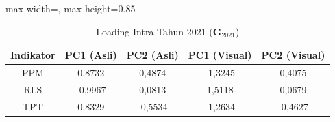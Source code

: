 \begin{table}[H]
\centering
\caption{Loading Intra Tahun 2021 ($\mathbf{G}_{2021}$)} \label{tab:sample1loading_intra_2021}
\begin{adjustbox}{max width=\textwidth, max height=0.85\textheight}
\begin{tabular}{|c|c|c|c|c|}
\hline
\textbf{Indikator} & \textbf{PC1 (Asli)} & \textbf{PC2 (Asli)} & \textbf{PC1 (Visual)} & \textbf{PC2 (Visual)} \\
\hline
PPM & 0,8732 & 0,4874 & -1,3245 & 0,4075 \\
RLS & -0,9967 & 0,0813 & 1,5118 & 0,0679 \\
TPT & 0,8329 & -0,5534 & -1,2634 & -0,4627 \\
\hline
\end{tabular}
\end{adjustbox}
\end{table}